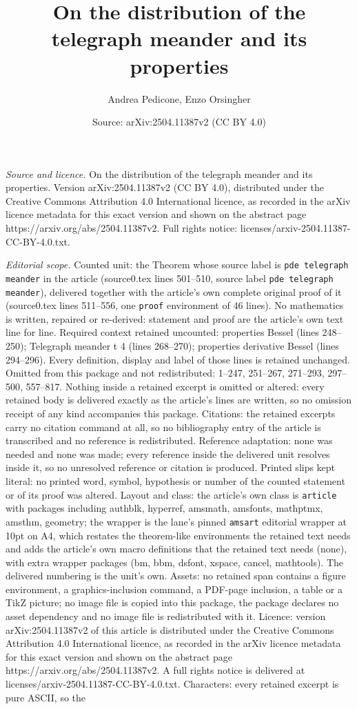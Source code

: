 \documentclass[10pt,a4paper]{amsart}
\title[On the distribution of the telegraph meander and its propert]{On the distribution of the telegraph meander and its properties}
\author{Andrea Pedicone, Enzo Orsingher}
\date{Source: arXiv:2504.11387v2 (CC BY 4.0)}
\begin{document}
\maketitle

\noindent\emph{Source and licence.} On the distribution of the telegraph meander and its properties. Version arXiv:2504.11387v2 (CC BY 4.0), distributed under the Creative Commons Attribution 4.0 International licence, as recorded in the arXiv licence metadata for this exact version and shown on the abstract page https://arxiv.org/abs/2504.11387v2. Full rights notice: licenses/arxiv-2504.11387-CC-BY-4.0.txt.\par\smallskip

\noindent\textit{Editorial scope.} Counted unit: the Theorem whose source label is \texttt{pde telegraph meander} in the article (source0.tex lines 501--510, source label \texttt{pde telegraph meander}), delivered together with the article's own complete original proof of it (source0.tex lines 511--556, one \texttt{proof} environment of 46 lines). No mathematics is written, repaired or re-derived: statement and proof are the article's own text line for line. Required context retained uncounted: properties Bessel (lines 248--250); Telegraph meander t 4 (lines 268--270); properties derivative Bessel (lines 294--296). Every definition, display and label of those lines is retained unchanged. Omitted from this package and not redistributed: 1--247, 251--267, 271--293, 297--500, 557--817. Nothing inside a retained excerpt is omitted or altered: every retained body is delivered exactly as the article's lines are written, so no omission receipt of any kind accompanies this package. Citations: the retained excerpts carry no citation command at all, so no bibliography entry of the article is transcribed and no reference is redistributed. Reference adaptation: none was needed and none was made; every reference inside the delivered unit resolves inside it, so no unresolved reference or citation is produced. Printed slips kept literal: no printed word, symbol, hypothesis or number of the counted statement or of its proof was altered. Layout and class: the article's own class is \texttt{article} with packages including authblk, hyperref, amsmath, amsfonts, mathptmx, amsthm, geometry; the wrapper is the lane's pinned \texttt{amsart} editorial wrapper at 10pt on A4, which restates the theorem-like environments the retained text needs and adds the article's own macro definitions that the retained text needs (none), with extra wrapper packages (bm, bbm, dsfont, xspace, cancel, mathtools). The delivered numbering is the unit's own. Assets: no retained span contains a figure environment, a graphics-inclusion command, a PDF-page inclusion, a table or a TikZ picture; no image file is copied into this package, the package declares no asset dependency and no image file is redistributed with it. Licence: version arXiv:2504.11387v2 of this article is distributed under the Creative Commons Attribution 4.0 International licence, as recorded in the arXiv licence metadata for this exact version and shown on the abstract page https://arxiv.org/abs/2504.11387v2. A full rights notice is delivered at licenses/arxiv-2504.11387-CC-BY-4.0.txt. Characters: every retained excerpt is pure ASCII, so the 
\end{document}
